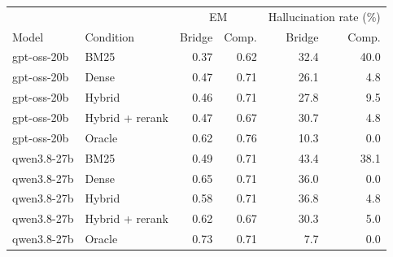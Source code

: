 \begin{tabular}{@{}llrrrr@{}}
\toprule
 &  & \multicolumn{2}{c}{EM} & \multicolumn{2}{c}{Hallucination rate (\%)} \\
Model & Condition & Bridge & Comp. & Bridge & Comp. \\
\midrule
gpt-oss-20b & BM25 & 0.37 & 0.62 & 32.4 & 40.0 \\
gpt-oss-20b & Dense & 0.47 & 0.71 & 26.1 & 4.8 \\
gpt-oss-20b & Hybrid & 0.46 & 0.71 & 27.8 & 9.5 \\
gpt-oss-20b & Hybrid + rerank & 0.47 & 0.67 & 30.7 & 4.8 \\
gpt-oss-20b & Oracle & 0.62 & 0.76 & 10.3 & 0.0 \\
\midrule
qwen3.8-27b & BM25 & 0.49 & 0.71 & 43.4 & 38.1 \\
qwen3.8-27b & Dense & 0.65 & 0.71 & 36.0 & 0.0 \\
qwen3.8-27b & Hybrid & 0.58 & 0.71 & 36.8 & 4.8 \\
qwen3.8-27b & Hybrid + rerank & 0.62 & 0.67 & 30.3 & 5.0 \\
qwen3.8-27b & Oracle & 0.73 & 0.71 & 7.7 & 0.0 \\
\bottomrule
\end{tabular}
